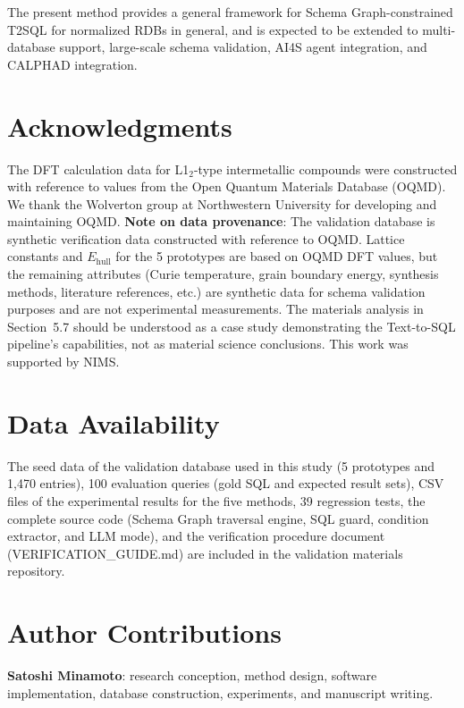 \documentclass[5p,twocolumn]{elsarticle}
\begin{document}
The present method provides a general framework for Schema Graph-constrained T2SQL
for normalized RDBs in general,
and is expected to be extended to multi-database support, large-scale schema validation,
AI4S agent integration, and CALPHAD integration.

\section*{Acknowledgments}

The DFT calculation data for L1$_2$-type intermetallic compounds were
constructed with reference to values from the Open Quantum Materials Database (OQMD).
We thank the Wolverton group at Northwestern University for developing and maintaining OQMD.
\textbf{Note on data provenance}: The validation database is synthetic verification data
constructed with reference to OQMD.
Lattice constants and $E_\text{hull}$ for the 5 prototypes are based on OQMD DFT values,
but the remaining attributes (Curie temperature, grain boundary energy, synthesis methods,
literature references, etc.) are synthetic data for schema validation purposes
and are not experimental measurements.
The materials analysis in Section~5.7 should be understood as a case study demonstrating
the Text-to-SQL pipeline's capabilities, not as material science conclusions.
This work was supported by NIMS.

\section*{Data Availability}

The seed data of the validation database used in this study (5 prototypes and 1{,}470 entries),
100 evaluation queries (gold SQL and expected result sets),
CSV files of the experimental results for the five methods, 39 regression tests,
the complete source code (Schema Graph traversal engine, SQL guard, condition extractor, and LLM mode),
and the verification procedure document (VERIFICATION\_GUIDE.md) are
included in the validation materials repository.
\section*{Author Contributions}

\textbf{Satoshi Minamoto}: research conception, method design, software implementation,
database construction, experiments, and manuscript writing.
\end{document}
